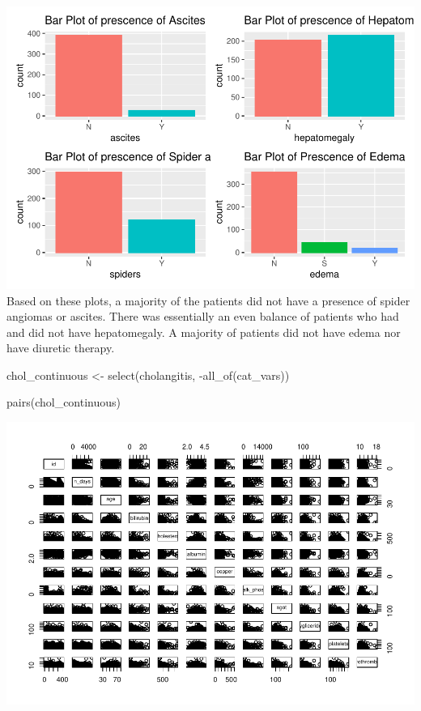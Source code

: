 \documentclass[
]{article}
\newenvironment{Shaded}{\begin{snugshade}}{\end{snugshade}}
\newcommand{\FunctionTok}[1]{\textcolor[rgb]{0.00,0.00,0.00}{#1}}
\newcommand{\NormalTok}[1]{#1}
\newcommand{\OtherTok}[1]{\textcolor[rgb]{0.56,0.35,0.01}{#1}}
\newcommand{\SpecialCharTok}[1]{\textcolor[rgb]{0.00,0.00,0.00}{#1}}
\begin{document}
\includegraphics{final_proj_files/figure-latex/medical indicators bar plot-1.pdf}
Based on these plots, a majority of the patients did not have a presence
of spider angiomas or ascites. There was essentially an even balance of
patients who had and did not have hepatomegaly. A majority of patients
did not have edema nor have diuretic therapy.

\begin{Shaded}
\begin{Highlighting}[]
\NormalTok{chol\_continuous }\OtherTok{\textless{}{-}} \FunctionTok{select}\NormalTok{(cholangitis, }\SpecialCharTok{{-}}\FunctionTok{all\_of}\NormalTok{(cat\_vars))}

\FunctionTok{pairs}\NormalTok{(chol\_continuous)}
\end{Highlighting}
\end{Shaded}

\includegraphics{final_proj_files/figure-latex/continuous-1.pdf}
\end{document}
